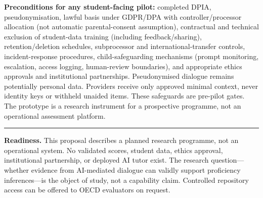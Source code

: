 \documentclass[10pt]{article}
\begin{document}
\smallskip\noindent\textbf{Preconditions for any student-facing pilot:}
completed DPIA, pseudonymisation, lawful basis under GDPR/DPA with
controller/processor allocation (not automatic parental-consent assumption),
contractual and technical exclusion of student-data training (including feedback/sharing),
retention/deletion schedules, subprocessor and international-transfer
controls, incident-response procedures, child-safeguarding mechanisms (prompt
monitoring, escalation, access logging, human-review boundaries), and
appropriate ethics approvals and institutional partnerships. Pseudonymised dialogue
remains potentially personal data. Providers receive only approved minimal context,
never identity keys or withheld unaided items. These safeguards are pre-pilot gates.  The prototype is a research instrument for a
prospective programme, not an operational assessment platform.

\medskip
{\color{ruleblue}\rule{\textwidth}{0.7pt}}
\medskip

\noindent\textbf{Readiness.}  This proposal describes a planned research
programme, not an operational system.  No validated scores, student data,
ethics approval, institutional partnership, or deployed AI tutor exist.  The
research question---whether evidence from AI-mediated dialogue can validly
support proficiency inferences---is the object of study, not a capability
claim.  Controlled repository access can be offered to OECD evaluators on
request.
\end{document}
